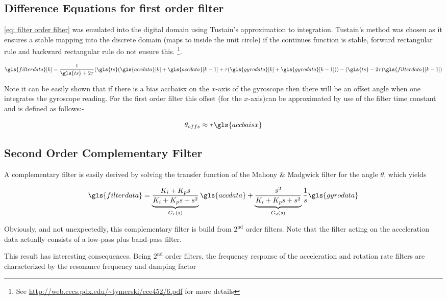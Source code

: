 \tocless\subsection{Difference Equations for first order filter}
\eqref{eq: filter order filter} was emulated into the digital domain using Tustain's approximation to integration. Tustain's method was chosen as it ensures a stable mapping into the discrete domain (maps to inside the unit circle) if the continues function is stable, forward rectangular rule and backward rectangular rule do not ensure this. \footnote{See \url{http://web.cecs.pdx.edu/~tymerski/ece452/6.pdf} for more details}.

\begin{equation}
\gls{filterdata} [k] = \frac{1}{\gls{ts} + 2\tau}(\gls{ts} ( \gls{accdata} [k] + \gls{accdata} [k-1] + \tau(\gls{gyrodata} [k]+\gls{gyrodata} [k-1])) -(\gls{ts} -2\tau)\gls{filterdata} [k-1] )
\end{equation}

Note it can be easily shown that if there is a bias \gls{accbaisx} on the $x$-axis of the gyroscope then there will be an offset angle when one integrates the gyroscope reading. For the first order filter this offset (for the $x$-axis)can be approximated by use of the filter time constant and is defined as follows:-

\[\theta_{offs} \approx {\tau}\gls{accbaisx} \]
 \tocless\subsection{Second Order Complementary Filter}

A complementary filter is easily derived by solving the transfer function of the Mahony \& Madgwick filter for the angle $\theta$, which yields

\begin{equation}
\gls{filterdata}=\underbrace{ {\frac{K_i + K_p s}{K_i + K_p s + s^2}}}_{\text{$G_1(s)$}}\gls{accdata} + \underbrace{\frac{s^2}{K_i+K_p s + s^2}}_{\text{$G_2(s)$}}\frac{1}{s}\gls{gyrodata}
\label{eq: second order filter}
\end{equation}

Obviously, and not unexpectedly, this complementary filter is build from $2^{\mathrm{nd}}$ order filters. Note that the filter acting on the acceleration data actually consists of a low-pass plus band-pass filter.

This result has interesting consequences. Being $2^{\mathrm{nd}}$ order filters, the frequency response of the acceleration and rotation rate filters are characterized by the resonance frequency and damping factor


